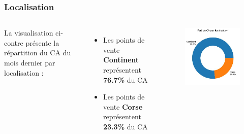 \documentclass{beamer}
\begin{document}
    \begin{frame}[plain]
        \tiny
        \frametitle{Localisation}

        \begin{columns}
                La visualisation ci-contre présente la répartition du CA du mois dernier par localisation :

                \begin{itemize}
                                            \item{Les points de vente \textbf{Continent} représentent \textbf{76.7\%} du CA}
                                            \item{Les points de vente \textbf{Corse} représentent \textbf{23.3\%} du CA}
                                    \end{itemize}

                \centering

                \begin{figure}[h]
                    \centering
                    \includegraphics[width=1\textwidth]{assets/ca_par_localisation}
                \end{figure}
        \end{columns}


\end{frame}
\end{document}
